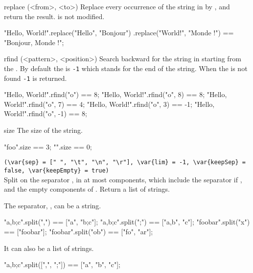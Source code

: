 \begin{urbiscriptapi}
\item[replace](<from>, <to>)%
  Replace every occurrence of the string  in
  \this by , and return the result.
  \this is not modified.
\begin{urbiassert}
"Hello, World!".replace("Hello", "Bonjour")
                      .replace("World!", "Monde !") ==
       "Bonjour, Monde !";
\end{urbiassert}


\item[rfind](<pattern>, <position>)%
  Search backward for the  string in \this starting from the
  .  By default the  is \lstinline|-1| which
  stands for the end of the string.  When the  is not found
  \lstinline|-1| is returned.
\begin{urbiassert}
"Hello, World!".rfind("o") == 8;
"Hello, World!".rfind("o", 8) == 8;
"Hello, World!".rfind("o", 7) == 4;
"Hello, World!".rfind("o", 3) == -1;
"Hello, World!".rfind("o", -1) == 8;
\end{urbiassert}


\item[size]
  The size of the string.
\begin{urbiassert}
"foo".size == 3;
   "".size == 0;
\end{urbiassert}

\item {}%
  \lstinline|(\var{sep} = [" ", "\t", "\n", "\r"], \var{lim} = -1, \var{keepSep} = false, \var{keepEmpty} = true)|\\
  Split \this on the separator , in at most 
  components, which include the separator if , and the
  empty components of .  Return a list of strings.

  The separator, , can be a string.

\begin{urbiassert}
       "a,b;c".split(",") == ["a", "b;c"];
       "a,b;c".split(";") == ["a,b", "c"];
      "foobar".split("x") == ["foobar"];
     "foobar".split("ob") == ["fo", "ar"];
\end{urbiassert}

\noindent
It can also be a list of strings.

\begin{urbiassert}
"a,b;c".split([",", ";"]) == ["a", "b", "c"];
\end{urbiassert}


\end{urbiscriptapi}
